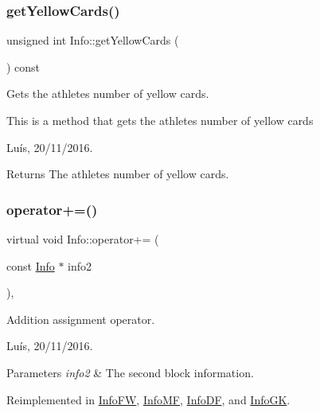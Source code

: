 \subsubsection{\texorpdfstring{get\+Yellow\+Cards()}{getYellowCards()}}
{\footnotesize\ttfamily unsigned int Info\+::get\+Yellow\+Cards (\begin{DoxyParamCaption}{ }\end{DoxyParamCaption}) const}



Gets the athlete\textquotesingle{}s number of yellow cards. 

This is a method that gets the athlete\textquotesingle{}s number of yellow cards

Luís, 20/11/2016. 

\begin{DoxyReturn}{Returns}
The athlete\textquotesingle{}s number of yellow cards. 
\end{DoxyReturn}
\hypertarget{class_info_a35d820d35f8ab3b8de15cdfc07f0c5a4}{}\label{class_info_a35d820d35f8ab3b8de15cdfc07f0c5a4} 
\subsubsection{\texorpdfstring{operator+=()}{operator+=()}}
{\footnotesize\ttfamily virtual void Info\+::operator+= (\begin{DoxyParamCaption}\item[{const \hyperlink{class_info}{Info} $\ast$}]{info2 }\end{DoxyParamCaption})\hspace{0.3cm}{\ttfamily [inline]}, {\ttfamily [virtual]}}



Addition assignment operator. 

Luís, 20/11/2016. 


\begin{DoxyParams}{Parameters}
{\em info2} & The second block information. \\
\hline
\end{DoxyParams}


Reimplemented in \hyperlink{class_info_f_w_aa4819d4c6348908eee81e5e71552cf8d}{Info\+FW}, \hyperlink{class_info_m_f_a937a1514afaedfa94b2f5372f91edce5}{Info\+MF}, \hyperlink{class_info_d_f_a7dc54a1e9dbb5028eb1f9972d1e42951}{Info\+DF}, and \hyperlink{class_info_g_k_a1554aaf307cb45226fb26c6d6380a47e}{Info\+GK}.

